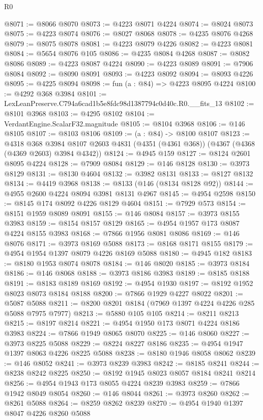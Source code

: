 \begin{lexlean}{R0}
\begin{coremodule}
@8071 := @8066 @8070
@8073 := @4223 @8071 @4224
@8074 := @8024 @8073
@8075 := @4223 @8074
@8076 := @8027 @8068
@8078 := @4235 @8076 @4268
@8079 := @8075 @8078
@8081 := @4223 @8079 @4226
@8082 := @4223 @8081
@8084 := @5654 @8076 @105
@8086 := @4235 @8084 @4268
@8087 := @8082 @8086
@8089 := @4223 @8087 @4224
@8090 := @4223 @8089
@8091 := @7906 @8084
@8092 := @8090 @8091
@8093 := @4223 @8092
@8094 := @8093 @4226
@8095 := @4225 @8094
@8098 := fun (a : @84) => @4223 @8095 @4224
@8100 := @4292 @368 @3984
@8101 := LexLeanPreserve.C794a6cad1b5e8fdc98d1387794c0d40c.R0.__fits_13
@8102 := @8101 @3968
@8103 := @4295 @8102
@8104 := VerdantEngine.ScalarF32.magnitude
@8105 := @8104 @3968
@8106 := @146 @8105
@8107 := @8103 @8106
@8109 := (a : @84) -> @8100 @8107
@8123 := @4318
    @368
    @3984
    @8107
    @2603
    @4831
    (@4351 (@4361 @368))
    (@4367 (@4368 (@4369 @2603) @3984 @4342))
@8124 := @4945 @159
@8127 := @8124 @2601 @8095 @4224
@8128 := @7909 @8084
@8129 := @146 @8128
@8130 := @3973 @8129
@8131 := @8130 @4604
@8132 := @3982 @8131
@8133 := @8127 @8132
@8134 := @4419 @3968
@8138 := @8133 (@146 (@8134 @8128 @92))
@8144 := @4955 @2600 @4224 @8094 @3981 @8131 @4967
@8145 := @4954 @2598
@8150 := @8145 @174 @8092 @4226 @8129 @4604
@8151 := @7929 @573
@8154 := @8151 @1959 @8089 @8091
@8155 := @146 @8084
@8157 := @3973 @8155 @3983
@8159 := @8154 @8157 @8129
@8165 := @4954 @1957 @173 @8087 @4224 @8155 @3983
@8168 := @7866 @1956 @8081 @8086
@8169 := @146 @8076
@8171 := @3973 @8169 @5088
@8173 := @8168 @8171 @8155
@8179 := @4954 @1954 @1397 @8079 @4226 @8169 @5088
@8180 := @4945 @182
@8183 := @8180 @1953 @8074 @8078
@8184 := @146 @8020
@8185 := @3973 @8184
@8186 := @146 @8068
@8188 := @3973 @8186 @3983
@8189 := @8185 @8188
@8191 := @8183 @8189 @8169
@8192 := @4954 @1930
@8197 := @8192 @1952 @8023 @8073 @8184 @8188
@8200 := @7866 @1929 @4227 @8022
@8201 := @5087 @5088
@8211 := @8200 @8201 @8184 (@7969 @1397 @4224 @4226 @285 @5088 @7975 @7977)
@8213 := @5880 @105 @105
@8214 := @8211 @8213
@8215 := @8197 @8214
@8221 := @4954 @1950 @173 @8071 @4224 @8186 @3983
@8224 := @7866 @1949 @8065 @8070
@8225 := @146 @8060
@8227 := @3973 @8225 @5088
@8229 := @8224 @8227 @8186
@8235 := @4954 @1947 @1397 @8063 @4226 @8225 @5088
@8238 := @8180 @1946 @8058 @8062
@8239 := @146 @8052
@8241 := @3973 @8239 @3983
@8242 := @8185 @8241
@8244 := @8238 @8242 @8225
@8250 := @8192 @1945 @8023 @8057 @8184 @8241 @8214
@8256 := @4954 @1943 @173 @8055 @4224 @8239 @3983
@8259 := @7866 @1942 @8049 @8054
@8260 := @146 @8044
@8261 := @3973 @8260
@8262 := @8261 @5088
@8264 := @8259 @8262 @8239
@8270 := @4954 @1940 @1397 @8047 @4226 @8260 @5088

\end{coremodule}
\end{lexlean}
